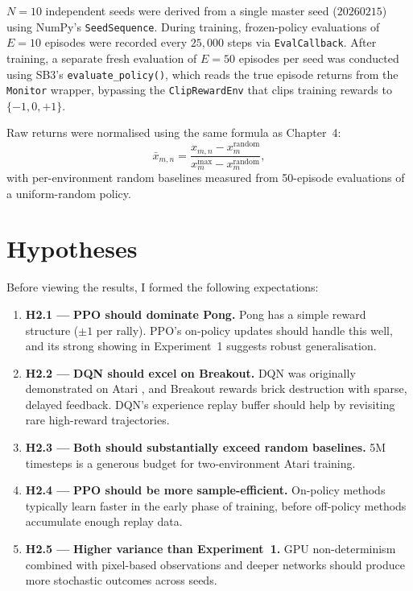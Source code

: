 $N = 10$ independent seeds were derived from a single master seed
($20260215$) using NumPy's \texttt{SeedSequence}. During training,
frozen-policy evaluations of $E = 10$ episodes were recorded every
$25{,}000$ steps via \texttt{EvalCallback}. After training, a separate
fresh evaluation of $E = 50$ episodes per seed was conducted using
SB3's \texttt{evaluate\_policy()}, which reads the true episode returns
from the \texttt{Monitor} wrapper, bypassing the
\texttt{ClipRewardEnv} that clips training rewards to $\{-1, 0, +1\}$.

Raw returns were normalised using the same formula as Chapter~4:
\[
  \bar{x}_{m,n} = \frac{x_{m,n} - x^{\text{random}}_m}
                       {x^{\max}_m - x^{\text{random}}_m},
\]
with per-environment random baselines measured from 50-episode
evaluations of a uniform-random policy.

\section{Hypotheses}
\label{sec:atari-hypotheses}

Before viewing the results, I formed the following expectations:

\begin{enumerate}
  \item {\color{red} \textbf{H2.1 ---}} \textbf{PPO should dominate Pong.}
        Pong has a simple reward structure ($\pm 1$ per rally). PPO's
        on-policy updates should handle this well, and its strong
        showing in Experiment~1 suggests robust generalisation.

  \item {\color{red} \textbf{H2.2 ---}} \textbf{DQN should excel on Breakout.}
        DQN was originally demonstrated on Atari
        \citep{mnih2015human}, and Breakout rewards brick destruction
        with sparse, delayed feedback. DQN's experience replay buffer
        should help by revisiting rare high-reward trajectories.

  \item {\color{red} \textbf{H2.3 ---}} \textbf{Both should substantially exceed random baselines.}
        5M timesteps is a generous budget for two-environment Atari
        training.

  \item {\color{red} \textbf{H2.4 ---}} \textbf{PPO should be more sample-efficient.}
        On-policy methods typically learn faster in the early phase of
        training, before off-policy methods accumulate enough replay
        data.

  \item {\color{red} \textbf{H2.5 ---}} \textbf{Higher variance than Experiment~1.}
        GPU non-determinism combined with pixel-based observations and
        deeper networks should produce more stochastic outcomes across
        seeds.
\end{enumerate}

